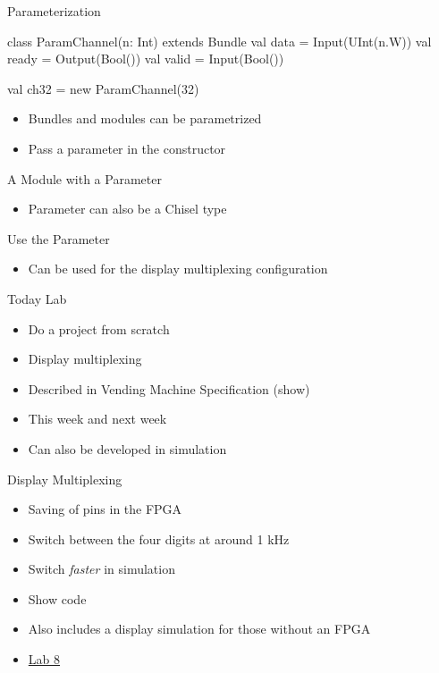 \begin{frame}[fragile]{Parameterization}
\begin{chisel}
class ParamChannel(n: Int) extends Bundle {
  val data = Input(UInt(n.W))
  val ready = Output(Bool())
  val valid = Input(Bool())
}

val ch32 = new ParamChannel(32)
\end{chisel}
\begin{itemize}
\item Bundles and modules can be parametrized
\item Pass a parameter in the constructor
\end{itemize}

\end{frame}
\begin{frame}[fragile]{A Module with a Parameter}
\begin{itemize}
\item Parameter can also be a Chisel type
\end{itemize}
\end{frame}

\begin{frame}[fragile]{Use the Parameter}
\begin{itemize}
\item Can be used for the display multiplexing configuration
\end{itemize}
\end{frame}

\begin{frame}[fragile]{Today Lab}
\begin{itemize}
\item Do a project from scratch
\item Display multiplexing
\item Described in Vending Machine Specification (show)
\item This week and next week
\item Can also be developed in simulation
\end{itemize}
\end{frame}

\begin{frame}[fragile]{Display Multiplexing}
\begin{itemize}
\item Saving of pins in the FPGA
\item Switch between the four digits at around 1 kHz
\item Switch \emph{faster} in simulation
\item Show code
\item Also includes a display simulation for those without an FPGA
\item \href{https://github.com/schoeberl/chisel-lab/tree/master/lab8}{Lab 8}
\end{itemize}
\end{frame}




